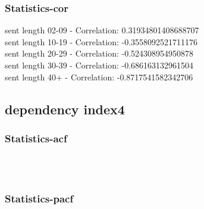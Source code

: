 \documentclass{article}%
\begin{document}
%
\newpage%
\subsubsection{Statistics{-}cor}%
\label{ssubsec:Statistics{-}cor}%
\noindent%
sent length 02-09 - Correlation: 0.31934801408688707\\%
sent length 10-19 - Correlation: -0.3558092521711176\\%
sent length 20-29 - Correlation: -0.524308954950878\\%
sent length 30-39 - Correlation: -0.686163132961504\\%
sent length 40+ - Correlation: -0.8717541582342706\\

%
\newpage

%
\subsection{dependency index4}%
\label{subsec:dependencyindex4}%
\subsubsection{Statistics{-}acf}%
\label{ssubsec:Statistics{-}acf}%


\begin{figure}[ht]%
\centering%
\setlength{\abovecaptionskip}{-35pt}%
%
%
\\%
%
%
\\%
%
\end{figure}

%
\newpage%
\subsubsection{Statistics{-}pacf}%
\label{ssubsec:Statistics{-}pacf}%
\end{document}
